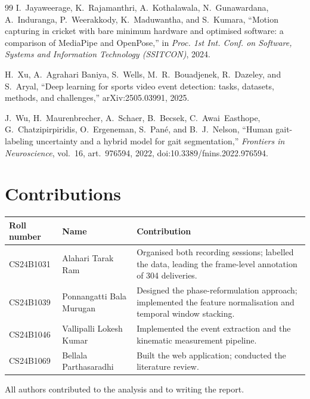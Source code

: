 \documentclass[11pt,a4paper]{article}
\begin{document}
\begin{thebibliography}{99}
I.~Jayaweerage, K.~Rajamanthri, A.~Kothalawala, N.~Gunawardana, A.~Induranga,
P.~Weerakkody, K.~Maduwantha, and S.~Kumara,
``Motion capturing in cricket with bare minimum hardware and optimised
software: a comparison of MediaPipe and OpenPose,''
in \emph{Proc. 1st Int. Conf. on Software, Systems and Information Technology
(SSITCON)}, 2024.

H.~Xu, A.~Agrahari Baniya, S.~Wells, M.~R.~Bouadjenek, R.~Dazeley, and
S.~Aryal,
``Deep learning for sports video event detection: tasks, datasets, methods,
and challenges,''
arXiv:2505.03991, 2025.

J.~Wu, H.~Maurenbrecher, A.~Schaer, B.~Becsek, C.~Awai~Easthope,
G.~Chatzipirpiridis, O.~Ergeneman, S.~Pan\'e, and B.~J.~Nelson,
``Human gait-labeling uncertainty and a hybrid model for gait segmentation,''
\emph{Frontiers in Neuroscience}, vol.~16, art.~976594, 2022,
doi:10.3389/fnins.2022.976594.

\end{thebibliography}

\section{Contributions}

\noindent
\begin{tabular}{@{}ll>{\raggedright\arraybackslash}p{7.2cm}@{}}
  \toprule
  Roll number & Name & Contribution \\
  \midrule
  CS24B1031 & Alahari Tarak Ram & Organised both recording sessions;
    labelled the data, leading the frame-level annotation of 304
    deliveries. \\[3pt]
  CS24B1039 & Ponnangatti Bala Murugan & Designed the phase-reformulation
    approach; implemented the feature normalisation and temporal window
    stacking. \\[3pt]
  CS24B1046 & Vallipalli Lokesh Kumar & Implemented the event extraction and
    the kinematic measurement pipeline. \\[3pt]
  CS24B1069 & Bellala Parthasaradhi & Built the web application; conducted
    the literature review. \\
  \bottomrule
\end{tabular}

\medskip
\noindent All authors contributed to the analysis and to writing the report.
\end{document}

